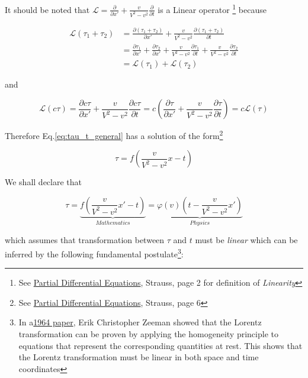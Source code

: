 It should be noted that $\mathscr{L} = \frac{\partial}{\partial x'} + \frac{v}{V^2 - v^2}\frac{\partial}{\partial t}$
is a Linear operator
\footnote{See \href{https://trello.com/c/5L46ePJQ}{Partial Differential Equations}, Strauss, page 2 for definition of \textit{Linearity}}
because

\begin{align}
    \mathscr{L}(\tau_1 + \tau_2) &= \frac{\partial(\tau_1 + \tau_2)}{\partial x'} + \frac{v}{V^2 - v^2}\frac{\partial(\tau_1 + \tau_2)}{\partial t} \\
    &= \frac{\partial\tau_1}{\partial x'} + \frac{\partial\tau_2}{\partial x'} + \frac{v}{V^2 - v^2}\frac{\partial\tau_1}{\partial t} + \frac{v}{V^2 - v^2}\frac{\partial\tau_2}{\partial t} \\
    &= \mathscr{L}(\tau_1) + \mathscr{L}(\tau_2)
\end{align}

and

\begin{equation}
    \mathscr{L}(c\tau) = \frac{\partial c\tau}{\partial x'} + \frac{v}{V^2 - v^2}\frac{\partial c\tau}{\partial t} = c\left( \frac{\partial\tau}{\partial x'} + \frac{v}{V^2 - v^2}\frac{\partial\tau}{\partial t} \right) = c\mathscr{L}(\tau)
\end{equation}

Therefore Eq.\ref{eq:tau_t_general} has a solution of the form\footnote{See \href{https://trello.com/c/5L46ePJQ}{Partial Differential Equations}, Strauss, page 6}

\begin{equation}
    \tau = f\left( \frac{v}{V^2 - v^2} x - t \right)
\end{equation}

We shall declare that

\begin{equation}\label{eq:transformation}
\tau = \underbrace{f\left( \frac{v}{V^2 - v^2} x' - t \right)}_{Mathematics} = \underbrace{\varphi(v)\left( t - \frac{v}{V^2 - v^2} x' \right)}_{Physics}
\end{equation}

which assumes that transformation between $\tau$ and $t$ must be \textit{linear} which can be inferred by the
following fundamental postulate\footnote{In a\href{https://download.wpsoftware.net/causality-lorentz-group-zeeman.pdf}{1964 paper}, Erik Christopher Zeeman showed that the Lorentz transformation can be proven by applying the homogeneity principle to equations that represent the corresponding quantities at rest. This shows that the Lorentz transformation must be linear in both space and time coordinates}:

